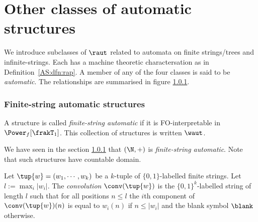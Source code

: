 
\section{Other classes of automatic structures}

We introduce subclasses of $\raut$ related to automata on finite strings/trees and infinite-strings. 
Each has a machine theoretic charactersation as in Definition~\ref{AS:dfn:rap}.
A member of any of the four classes is said to be {\em automatic}. The relationships are summarised in figure \ref{}. %

\subsubsection{Finite-string automatic structures}

\begin{definition}
A structure is called {\em finite-string automatic} if it is FO-interpretable in $\Power_f[\frakT_1]$. This collection of structures is written $\waut$.
\end{definition}

We have seen in the section \ref{} that $(\N,+)$ is {\em finite-string automatic}. 
Note that such structures have countable domain. %

\begin{definition}
Let $\tup{w} = (w_1,\cdots,w_k)$
be a $k$-tuple of $\{0,1\}$-labelled finite strings. Let $l:= \max_i |w_i|$.
The {\em convolution} $\conv(\tup{w})$ is the $\{0,1\}^k$-labelled string of length $l$ such that for all positions $n \leq l$
the $i$th component of $\conv(\tup{w})(n)$ is equal to $w_i(n)$ if $n \leq |w_i|$ and the blank symbol $\blank$ otherwise.
\end{definition} %

